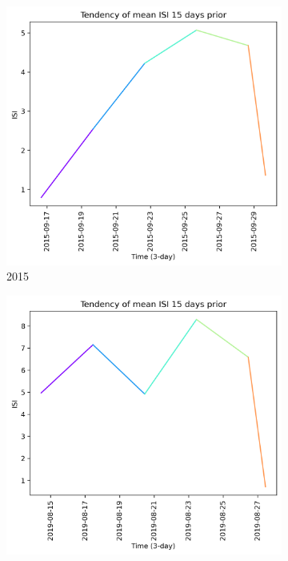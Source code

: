 \begin{figure}[h]
    \centering
    \caption{ISI values 15 days prior to wildfire}
    \begin{subfigure}{0.3\textwidth}
        \centering
        \includegraphics[width=\textwidth]{graphs/15days/2015_15daysprior_tendency_graph_ISI.png}
        \caption{2015}
        \label{fig:isi_prior_15_days_2015}
    \end{subfigure}
    \hfill
    \begin{subfigure}{0.3\textwidth}
        \centering
        \includegraphics[width=\textwidth]{graphs/15days/2019_15daysprior_tendency_graph_ISI.png}

\end{subfigure}
\end{figure}
